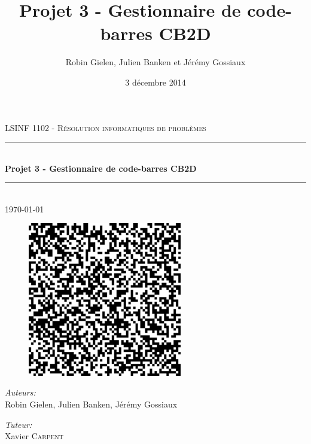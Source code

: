 \documentclass[10pt]{article}
\title{Projet 3 - Gestionnaire de code-barres CB2D}
\date{3 décembre 2014}
\author{Robin Gielen, Julien Banken et Jérémy Gossiaux}
\newcommand{\HRule}{\rule{\linewidth}{0.5mm}}
\begin{document}
\begin{titlepage}
\begin{center}


\textsc{\Large LSINF 1102 - Résolution informatiques de problèmes}\\[0.5cm]

\HRule \\[0.4cm]
{ \huge \bfseries Projet 3 - Gestionnaire de code-barres CB2D \\[0.4cm] }

\HRule \\[1.5cm]

{\large \today}

\vfill


\begin{figure}[!h]
	\centering
	\includegraphics[width=0.6\textwidth]{images/barcode.png}
	\label{Code-barre}
\end{figure}
\vfill

\noindent
\begin{minipage}{0.4\textwidth}
\begin{flushleft} \large 
\emph{Auteurs:}\\
Robin Gielen, Julien Banken, Jérémy Gossiaux \textsc{} 
\end{flushleft}
\end{minipage}%
\begin{minipage}{0.4\textwidth}
\begin{flushright} \large
\emph{Tuteur:} \\
Xavier \textsc{Carpent}
\end{flushright}
\end{minipage}



\end{center}
\end{titlepage}

\tableofcontents










\end{document}
